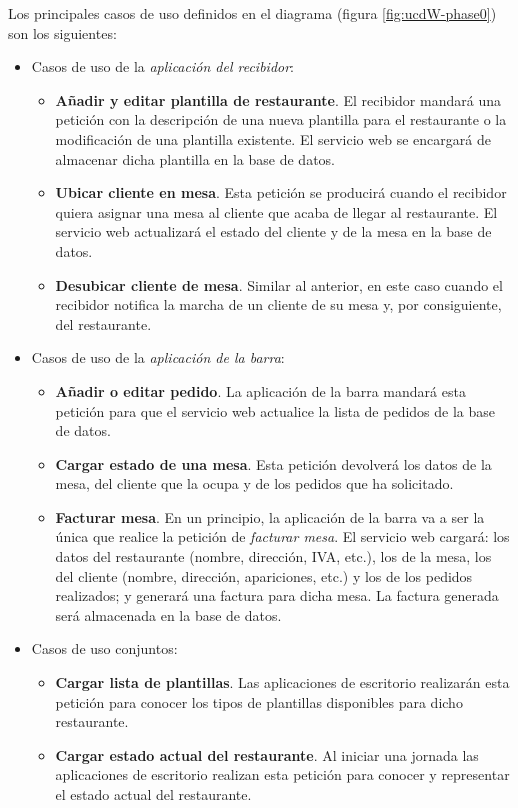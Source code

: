 Los principales casos de uso definidos en el diagrama (figura
\ref{fig:ucdW-phase0}) son los siguientes:
\begin{itemize}
\item Casos de uso de la \emph{aplicación del recibidor}:
  \begin{itemize}
  \item \textbf{Añadir y editar plantilla de restaurante}. El recibidor
  mandará una petición con la descripción de una nueva plantilla para el 
  restaurante o la modificación de una plantilla existente. El servicio web se 
  encargará de almacenar dicha plantilla en la base de datos.
  \item \textbf{Ubicar cliente en mesa}. Esta petición se producirá cuando
  el recibidor quiera asignar una mesa al cliente que acaba de llegar al
  restaurante. El servicio web actualizará el estado del cliente y de la
  mesa en la base de datos.
  \item \textbf{Desubicar cliente de mesa}. Similar al anterior, en este caso
  cuando el recibidor notifica la marcha de un cliente de su mesa y, por
  consiguiente, del restaurante.
  \end{itemize}
\item Casos de uso de la \emph{aplicación de la barra}:
  \begin{itemize}
  \item \textbf{Añadir o editar pedido}. La aplicación de la barra mandará
  esta petición para que el servicio web actualice la lista de pedidos
  de la base de datos.
  \item \textbf{Cargar estado de una mesa}. Esta petición devolverá los datos
  de la mesa, del cliente que la ocupa y de los pedidos que ha solicitado.
  \item \textbf{Facturar mesa}. En un principio, la aplicación de la barra
  va a ser la única que realice la petición de \emph{facturar mesa}. El
  servicio web cargará: los datos del restaurante (nombre, dirección, IVA, 
  etc.), los de la mesa, los del cliente (nombre, dirección, apariciones, 
  etc.) y los de los pedidos realizados; y generará una factura para dicha
  mesa. La factura generada será almacenada en la base de datos.
  \end{itemize}
\item Casos de uso conjuntos:
  \begin{itemize}
  \item \textbf{Cargar lista de plantillas}. Las aplicaciones de escritorio
  realizarán esta petición para conocer los tipos de plantillas disponibles 
  para dicho restaurante.
  \item \textbf{Cargar estado actual del restaurante}. Al iniciar una jornada
  las aplicaciones de escritorio realizan esta petición para conocer y
  representar el estado actual del restaurante.
  \end{itemize}
\end{itemize}

